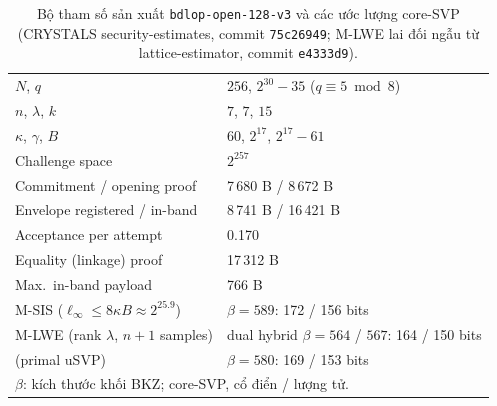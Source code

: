 \begin{table}[t]
\centering
\caption{Bộ tham số sản xuất \texttt{bdlop-open-128-v3} và các ước lượng core-SVP
(CRYSTALS security-estimates, commit \texttt{75c26949}; M-LWE lai đối ngẫu
từ lattice-estimator, commit \texttt{e4333d9}).}
\label{tab:params}
\small\setlength{\tabcolsep}{4pt}
\begin{tabular}{ll}
\toprule
$N$, $q$ & $256$, $2^{30}-35$ ($q\equiv5 \bmod 8$) \\
$n$, $\lambda$, $k$ & $7$, $7$, $15$ \\
$\kappa$, $\gamma$, $B$ & $60$, $2^{17}$, $2^{17}-61$ \\
Challenge space & $2^{257}$ \\
Commitment / opening proof & 7\,680 B / 8\,672 B \\
Envelope registered / in-band & 8\,741 B / 16\,421 B \\
Acceptance per attempt & 0.170 \\
Equality (linkage) proof & 17\,312 B \\
Max.\ in-band payload & 766 B \\
M-SIS ($\ell_\infty\le8\kappa B\approx2^{25.9}$) & $\beta=589$: 172 / 156 bits \\
M-LWE (rank $\lambda$, $n{+}1$ samples) & dual hybrid $\beta=564$ / $567$: 164 / 150 bits \\
\quad (primal uSVP) & $\beta=580$: 169 / 153 bits \\
\multicolumn{2}{l}{\footnotesize $\beta$: kích thước khối BKZ; core-SVP, cổ điển / lượng tử.} \\
\bottomrule
\end{tabular}
\end{table}
